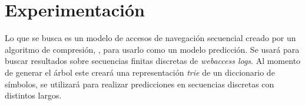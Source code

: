 \chapter[Experimentación]{Experimentación}\label{ch:experimetal-all}


























{
}

Lo que se busca es un modelo de accesos de navegación secuencial creado por un algoritmo de compresión, \lempelziv,  para usarlo como un modelo  predicción. Se usará para buscar resultados sobre secuencias finitas discretas de \emph{webaccess logs}. Al momento de generar el árbol este creará una representación \emph{trie} de un diccionario de símbolos, se utilizará para realizar predicciones en secuencias discretas con distintos largos.

